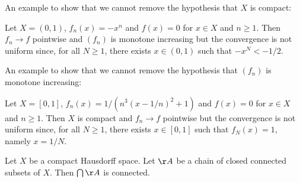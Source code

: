 An example to show that we cannot remove the hypothesis that $X$ is compact:

\begin{example}
    Let $X = (0,1)$, $f_n(x) = -x^n$ and $f(x) = 0$ for $x \in X$ and $n \geq 1$. Then $f_n \rightarrow f$ pointwise and $(f_n)$ is monotone
    increasing but the convergence is not uniform since, for all $N \geq 1$, there exists $x \in (0,1)$ such that $-x^N < -1/2$.
\end{example}

An example to show that we cannot remove the hypothesis that $(f_n)$ is monotone increasing:

\begin{example}
    Let $X = [0,1]$, $f_n(x) = 1 / (n^3 (x - 1/n)^2 + 1)$ and $f(x) = 0$ for $x \in X$ and $n \geq 1$. Then $X$ is compact and $f_n \rightarrow f$
    pointwise but the convergence is not uniform since, for all $N \geq 1$, there exists $x \in [0,1]$ such that $f_N(x) = 1$, namely
    $x = 1/N$.
\end{example}

\begin{theorem}
    Let $X$ be a compact Hausdorff space. Let $\AA$ be a chain of closed connected subsets of $X$. Then $\bigcap \AA$ is connected.
\end{theorem}

